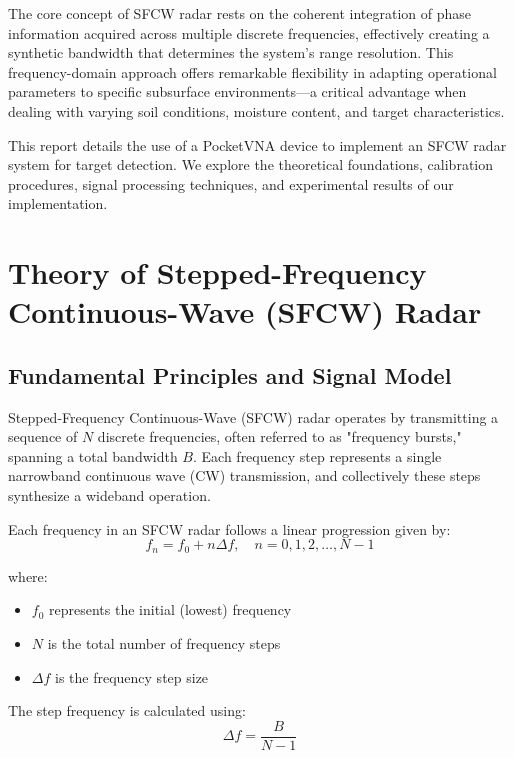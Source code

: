 \documentclass[11pt,a4paper]{article}
\begin{document}
The core concept of SFCW radar rests on the coherent integration of phase information acquired across multiple discrete frequencies, effectively creating a synthetic bandwidth that determines the system's range resolution. This frequency-domain approach offers remarkable flexibility in adapting operational parameters to specific subsurface environments—a critical advantage when dealing with varying soil conditions, moisture content, and target characteristics.

This report details the use of a PocketVNA device to implement an SFCW radar system for target detection. We explore the theoretical foundations, calibration procedures, signal processing techniques, and experimental results of our implementation.

\section{Theory of Stepped-Frequency Continuous-Wave (SFCW) Radar}

\subsection{Fundamental Principles and Signal Model}

Stepped-Frequency Continuous-Wave (SFCW) radar operates by transmitting a sequence of $N$ discrete frequencies, often referred to as "frequency bursts," spanning a total bandwidth $B$. Each frequency step represents a single narrowband continuous wave (CW) transmission, and collectively these steps synthesize a wideband operation.

Each frequency in an SFCW radar follows a linear progression given by:
\begin{equation}
    f_n = f_0 + n \Delta f,\quad n = 0, 1, 2, \ldots, N-1
\end{equation}

where:
\begin{itemize}
    \item $f_0$ represents the initial (lowest) frequency
    \item $N$ is the total number of frequency steps
    \item $\Delta f$ is the frequency step size
\end{itemize}

The step frequency is calculated using:
\begin{equation}
    \Delta f = \frac{B}{N-1}
\end{equation}
\end{document}
